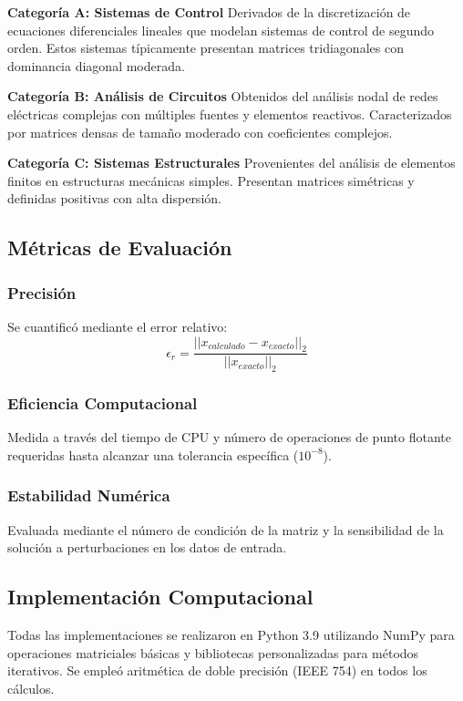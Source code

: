 \documentclass[conference]{IEEEtran}
\begin{document}
\textbf{Categoría A: Sistemas de Control}
Derivados de la discretización de ecuaciones diferenciales lineales que modelan sistemas de control de segundo orden. Estos sistemas típicamente presentan matrices tridiagonales con dominancia diagonal moderada.

\textbf{Categoría B: Análisis de Circuitos}
Obtenidos del análisis nodal de redes eléctricas complejas con múltiples fuentes y elementos reactivos. Caracterizados por matrices densas de tamaño moderado con coeficientes complejos.

\textbf{Categoría C: Sistemas Estructurales}
Provenientes del análisis de elementos finitos en estructuras mecánicas simples. Presentan matrices simétricas y definidas positivas con alta dispersión.

\subsection{Métricas de Evaluación}

\subsubsection{Precisión}
Se cuantificó mediante el error relativo:
\begin{equation}
\epsilon_r = \frac{||x_{calculado} - x_{exacto}||_2}{||x_{exacto}||_2}
\end{equation}

\subsubsection{Eficiencia Computacional}
Medida a través del tiempo de CPU y número de operaciones de punto flotante requeridas hasta alcanzar una tolerancia específica ($10^{-8}$).

\subsubsection{Estabilidad Numérica}
Evaluada mediante el número de condición de la matriz y la sensibilidad de la solución a perturbaciones en los datos de entrada.

\subsection{Implementación Computacional}

Todas las implementaciones se realizaron en Python 3.9 utilizando NumPy para operaciones matriciales básicas y bibliotecas personalizadas para métodos iterativos. Se empleó aritmética de doble precisión (IEEE 754) en todos los cálculos.
\end{document}

